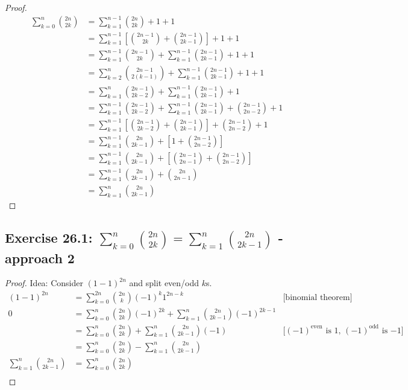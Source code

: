 \documentclass[a4paper]{article}
\theoremstyle{definition}
\begin{document}
\begin{proof}
  \begin{align*}
    \sum_{k=0}^n \binom{2n}{2k}
      &= \sum_{k=1}^{n-1} \binom{2n}{2k} + 1 + 1 \\
      &= \sum_{k=1}^{n-1} \left[\binom{2n-1}{2k} + \binom{2n-1}{2k-1}\right] + 1 + 1 \\
      &= \sum_{k=1}^{n-1} \binom{2n-1}{2k} + \sum_{k=1}^{n-1} \binom{2n-1}{2k-1} + 1 + 1 \\
      &= \sum_{k=2}^{n} \binom{2n-1}{2(k - 1)} + \sum_{k=1}^{n-1} \binom{2n-1}{2k-1} + 1 + 1 \\
      &= \sum_{k=1}^{n} \binom{2n-1}{2k-2} + \sum_{k=1}^{n-1} \binom{2n-1}{2k-1} + 1 \\
      &= \sum_{k=1}^{n-1} \binom{2n-1}{2k-2} + \sum_{k=1}^{n-1} \binom{2n-1}{2k-1} + \binom{2n-1}{2n-2} + 1 \\
      &= \sum_{k=1}^{n-1} \left[\binom{2n-1}{2k-2} + \binom{2n-1}{2k-1}\right] + \binom{2n-1}{2n-2} + 1 \\
      &= \sum_{k=1}^{n-1} \binom{2n}{2k-1} + \left[1 + \binom{2n-1}{2n-2}\right] \\
      &= \sum_{k=1}^{n-1} \binom{2n}{2k-1} + \left[\binom{2n-1}{2n-1} + \binom{2n-1}{2n-2}\right] \\
      &= \sum_{k=1}^{n-1} \binom{2n}{2k-1} + \binom{2n}{2n-1} \\
      &= \sum_{k=1}^{n} \binom{2n}{2k-1}
  \end{align*}
\end{proof}

\subsection{Exercise 26.1: $\sum_{k=0}^n \binom{2n}{2k} = \sum_{k=1}^n \binom{2n}{2k-1}$ - approach 2}

\begin{proof}
  Idea: Consider $(1-1)^{2n}$ and split even/odd $k$s.
  \begin{align*}
    (1 - 1)^{2n} &= \sum_{k=0}^{2n} \binom{2n}{k} (-1)^k 1^{2n-k} & \text{[binomial theorem]} \\
               0 &= \sum_{k=0}^n \binom{2n}{2k} (-1)^{2k} + \sum_{k=1}^n \binom{2n}{2k-1} (-1)^{2k-1} \\
                 &= \sum_{k=0}^n \binom{2n}{2k} + \sum_{k=1}^n \binom{2n}{2k-1} (-1) & \text{[$(-1)^\text{even}$ is $1$, $(-1)^\text{odd}$ is $-1$]} \\
                 &= \sum_{k=0}^n \binom{2n}{2k} - \sum_{k=1}^n \binom{2n}{2k-1} \\
    \sum_{k=1}^n \binom{2n}{2k-1} &= \sum_{k=0}^n \binom{2n}{2k} \\
  \end{align*}
\end{proof}
\end{document}
